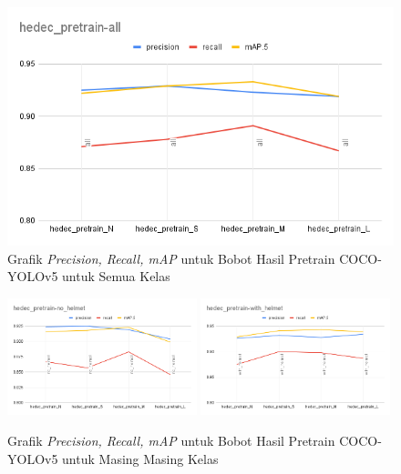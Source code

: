 \begin{figure}[ht]
  \centering
  \includegraphics[width=1\textwidth]{gambar/final_weight_val/hedec_pretrain-all.png}
  \caption{Grafik \emph{Precision, Recall, mAP} untuk Bobot Hasil Pretrain COCO-YOLOv5 untuk Semua Kelas}
  \label{fig:grafval_pretrain_all}  
\end{figure}

\begin{figure}[ht]
  \centering
  \includegraphics[width=0.49\textwidth]{gambar/final_weight_val/hedec_pretrain-no_helmet.png}
  \includegraphics[width=0.49\textwidth]{gambar/final_weight_val/hedec_pretrain-with_helmet.png}
  \caption{Grafik \emph{Precision, Recall, mAP} untuk Bobot Hasil Pretrain COCO-YOLOv5 untuk Masing Masing Kelas}
  \label{fig:grafval_pretrain_eachclass}  
\end{figure}


